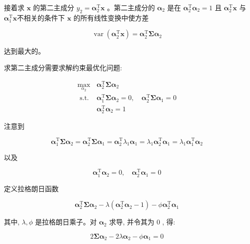 \documentclass[10pt]{article}
\begin{document}
接着求 $\boldsymbol{x}$ 的第二主成分 $y_{2}=\boldsymbol{\alpha}_{2}^{\mathrm{T}} \boldsymbol{x}$ 。第二主成分的 $\boldsymbol{\alpha}_{2}$ 是在 $\boldsymbol{\alpha}_{2}^{\mathrm{T}} \boldsymbol{\alpha}_{2}=1$ 且 $\boldsymbol{\alpha}_{2}^{\mathrm{T}} \boldsymbol{x}$ 与 $\boldsymbol{\alpha}_{1}^{\mathrm{T}} \boldsymbol{x}$不相关的条件下 $\boldsymbol{x}$ 的所有线性变换中使方差

$$
\operatorname{var}\left(\boldsymbol{\alpha}_{2}^{\mathrm{T}} \boldsymbol{x}\right)=\boldsymbol{\alpha}_{2}^{\mathrm{T}} \boldsymbol{\Sigma} \boldsymbol{\alpha}_{2}
$$

达到最大的。

求第二主成分需要求解约束最优化问题:

\[
\begin{array}{ll}
\max _{\alpha_{2}} & \boldsymbol{\alpha}_{2}^{\mathrm{T}} \boldsymbol{\Sigma} \boldsymbol{\alpha}_{2}  \tag{16.9}\\
\text { s.t. } & \boldsymbol{\alpha}_{1}^{\mathrm{T}} \boldsymbol{\Sigma} \boldsymbol{\alpha}_{2}=0, \quad \boldsymbol{\alpha}_{2}^{\mathrm{T}} \boldsymbol{\Sigma} \boldsymbol{\alpha}_{1}=0 \\
& \boldsymbol{\alpha}_{2}^{\mathrm{T}} \boldsymbol{\alpha}_{2}=1
\end{array}
\]

注意到

$$
\boldsymbol{\alpha}_{1}^{\mathrm{T}} \boldsymbol{\Sigma} \boldsymbol{\alpha}_{2}=\boldsymbol{\alpha}_{2}^{\mathrm{T}} \boldsymbol{\Sigma} \boldsymbol{\alpha}_{1}=\boldsymbol{\alpha}_{2}^{\mathrm{T}} \lambda_{1} \boldsymbol{\alpha}_{1}=\lambda_{1} \boldsymbol{\alpha}_{2}^{\mathrm{T}} \boldsymbol{\alpha}_{1}=\lambda_{1} \boldsymbol{\alpha}_{1}^{\mathrm{T}} \boldsymbol{\alpha}_{2}
$$

以及

$$
\boldsymbol{\alpha}_{1}^{\mathrm{T}} \boldsymbol{\alpha}_{2}=0, \quad \boldsymbol{\alpha}_{2}^{\mathrm{T}} \boldsymbol{\alpha}_{1}=0
$$

定义拉格朗日函数

$$
\boldsymbol{\alpha}_{2}^{\mathrm{T}} \boldsymbol{\Sigma} \boldsymbol{\alpha}_{2}-\lambda\left(\boldsymbol{\alpha}_{2}^{\mathrm{T}} \boldsymbol{\alpha}_{2}-1\right)-\phi \boldsymbol{\alpha}_{2}^{\mathrm{T}} \boldsymbol{\alpha}_{1}
$$

其中, $\lambda, \phi$ 是拉格朗日乘子。对 $\boldsymbol{\alpha}_{2}$ 求导, 并令其为 0 , 得:


\begin{equation*}
2 \boldsymbol{\Sigma} \boldsymbol{\alpha}_{2}-2 \lambda \boldsymbol{\alpha}_{2}-\phi \boldsymbol{\alpha}_{1}=0 \tag{16.10}
\end{equation*}
\end{document}
